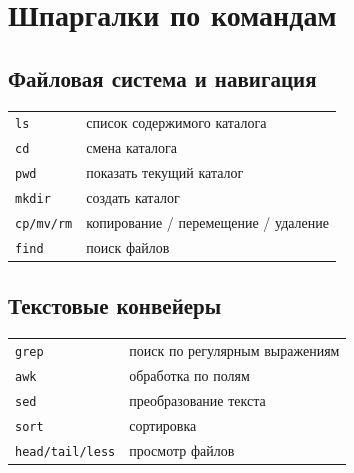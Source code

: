 \chapter{Шпаргалки по командам}
\label{app:cheatsheets}


\section{Файловая система и навигация}
\begin{center}
\begin{tabular}{@{}ll@{}}
\texttt{ls}      & список содержимого каталога \\
\texttt{cd}      & смена каталога \\
\texttt{pwd}     & показать текущий каталог \\
\texttt{mkdir}   & создать каталог \\
\texttt{cp/mv/rm} & копирование / перемещение / удаление \\
\texttt{find}    & поиск файлов \\
\end{tabular}
\end{center}

\section{Текстовые конвейеры}
\begin{center}
\begin{tabular}{@{}ll@{}}
\texttt{grep} & поиск по регулярным выражениям \\
\texttt{awk}  & обработка по полям \\
\texttt{sed}  & преобразование текста \\
\texttt{sort} & сортировка \\
\texttt{head/tail/less} & просмотр файлов \\
\end{tabular}
\end{center}

